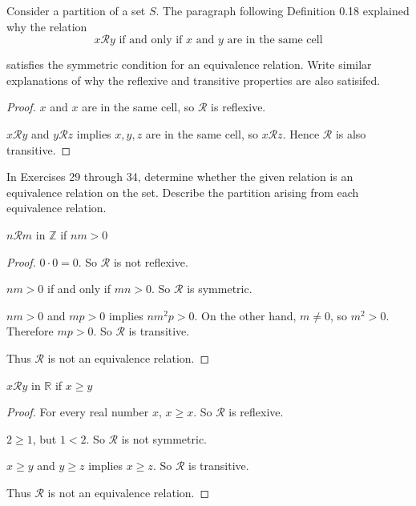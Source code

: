 \newpage
\begin{exercise}
    Consider a partition of a set $S$. The paragraph following Definition 0.18 explained why the relation
    \[
        x\mathscr{R}y \text{\ if and only if $x$ and $y$ are in the same cell}
    \]

    satisfies the symmetric condition for an equivalence relation. Write similar explanations of why the reflexive and transitive properties are also satisifed.
\end{exercise}

\begin{proof}
    $x$ and $x$ are in the same cell, so $\mathscr{R}$ is reflexive.

    $x\mathscr{R}y$ and $y\mathscr{R}z$ implies $x, y, z$ are in the same cell, so $x\mathscr{R}z$. Hence $\mathscr{R}$ is also transitive.
\end{proof}

In Exercises 29 through 34, determine whether the given relation is an equivalence relation on the set. Describe the partition arising from each equivalence relation.

\newpage
\begin{exercise}
    $n\mathscr{R}m$ in $\mathbb{Z}$ if $nm > 0$
\end{exercise}

\begin{proof}
    $0\cdot 0 = 0$. So $\mathscr{R}$ is not reflexive.

    $nm > 0$ if and only if $mn > 0$. So $\mathscr{R}$ is symmetric.

    $nm > 0$ and $mp > 0$ implies $n{m}^{2}p > 0$. On the other hand, $m\ne 0$, so $m^{2} > 0$. Therefore $mp > 0$. So $\mathscr{R}$ is transitive.

    Thus $\mathscr{R}$ is not an equivalence relation.
\end{proof}

\newpage
\begin{exercise}
    $x\mathscr{R}y$ in $\mathbb{R}$ if $x\ge y$
\end{exercise}

\begin{proof}
    For every real number $x$, $x\ge x$. So $\mathscr{R}$ is reflexive.

    $2\ge 1$, but $1 < 2$. So $\mathscr{R}$ is not symmetric.

    $x\ge y$ and $y\ge z$ implies $x\ge z$. So $\mathscr{R}$ is transitive.

    Thus $\mathscr{R}$ is not an equivalence relation.
\end{proof}

